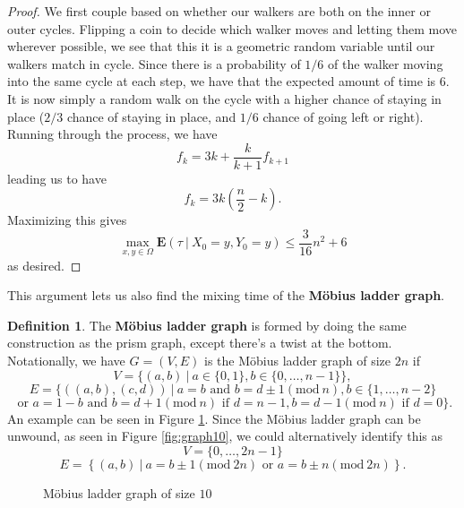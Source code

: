 \documentclass[10pt,a4paper]{amsart}
\theoremstyle{definition}
\newtheorem{definition}{Definition}
\numberwithin{definition}{section}
\newcommand{\Mod}[1]{(\mathrm{mod}\ #1)}
\begin{document}
\begin{proof}
We first couple based on whether our walkers are both on the inner or outer cycles. Flipping a coin to decide which walker moves and letting them move wherever possible, we see that this it is a geometric random variable until our walkers match in cycle. Since there is a probability of $1/6$ of the walker moving into the same cycle at each step, we have that the expected amount of time is $6$. It is now simply a random walk on the cycle with a higher chance of staying in place ($2/3$ chance of staying in place, and $1/6$ chance of going left or right). Running through the process, we have 
\[ f_k = 3k + \frac{k}{k+1} f_   {k+1}\]
leading us to have
\[ f_k = 3k\left(\frac{n}{2}-k\right).\]
Maximizing this gives 
\[ \max_{x,y \in \Omega} \mathbf{E}(\tau \ | \ X_0 = y, Y_0 =y) \leq \frac{3}{16} n^2 + 6\]
as desired.
\end{proof}

This argument lets us also find the mixing time of the \textbf{M\"{o}bius ladder graph}. 

\begin{definition}
The \textbf{M\"{o}bius ladder graph} is formed by doing the same construction as the prism graph, except there's a twist at the bottom. Notationally, we have $G = (V,E)$ is the M\"{o}bius ladder graph of size $2n$ if
\[V = \{ (a,b) \ | \ a \in \{0,1\}, b \in \{0, \ldots, n-1\} \}, \] 
\[E = \{\left((a,b), (c,d)\right) \ | \ a = b \text{ and } b = d \pm 1 \Mod{n}, b \in \{1, \ldots, n-2\} \]
\[ \text{ or } a = 1-b \text{ and } b = d +1 \Mod{n} \text{ if } d = n-1, b = d-1 \Mod{n} \text{ if } d = 0 \}. \]
An example can be seen in Figure \ref{fig:graph11}. Since the M\"{o}bius ladder graph can be unwound, as seen in Figure \ref{fig:graph10}, we could alternatively identify this as 
\[V = \{0, \ldots, 2n-1\} \]
\[E = \left\{(a,b) \ | \ a = b \pm 1 \Mod{2n} \text { or } a = b \pm n \Mod{2n}\right\}. \]
\end{definition}

\begin{figure}
    
\caption{M\"{o}bius ladder graph of size $10$}
    \label{fig:graph11}
\end{figure}
\end{document}
